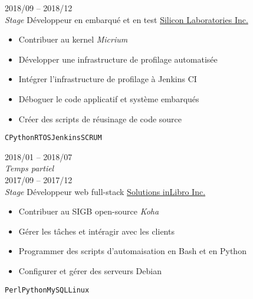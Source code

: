 \documentclass[9pt]{developercv} %
\begin{document}
\begin{minipage}[t]{0.8\textwidth}

\begin{entrylist}
	\entry
		{2018/09 -- 2018/12\\{\small\emph{Stage}}}
		{Développeur en embarqué et en test}
		{\href{https://www.silabs.com/}{Silicon Laboratories Inc.}}
		{
			\vspace{-14pt}
			\begin{itemize}
				\renewcommand{\labelitemi}{\raisebox{.45ex}{\rule{.6ex}{.6ex}}}
				\setlength\itemsep{-1pt}
				\item Contribuer au kernel \emph{Micrium}
				\item Développer une infrastructure de profilage automatisée
				\item Intégrer l'infrastructure de profilage à Jenkins CI
				\item Déboguer le code applicatif et système embarqués
				\item Créer des scripts de réusinage de code source
			\end{itemize}
			\vspace{-4pt}
			\texttt{C}\slashsep\texttt{Python}\slashsep\texttt{RTOS}\slashsep\texttt{Jenkins}\slashsep\texttt{SCRUM}
		}
	\entry
		{2018/01 -- 2018/07\\{\small\emph{Temps partiel}}\\2017/09 -- 2017/12\\{\small\emph{Stage}}}
		{Développeur web full-stack}
		{\href{https://inlibro.com/}{Solutions inLibro Inc.}}
		{
			\vspace{-14pt}
			\begin{itemize}
				\renewcommand{\labelitemi}{\raisebox{.45ex}{\rule{.6ex}{.6ex}}}
				\setlength\itemsep{-1pt}
				\item Contribuer au SIGB open-source \emph{Koha}
				\item Gérer les tâches et intéragir avec les clients
				\item Programmer des scripts d'automaisation en Bash et en Python
				\item Configurer et gérer des serveurs Debian
			\end{itemize}
			\vspace{-4pt}
			\texttt{Perl}\slashsep\texttt{Python}\slashsep\texttt{MySQL}\slashsep\texttt{Linux}
		}
\end{entrylist}



\end{minipage}
\end{document}
